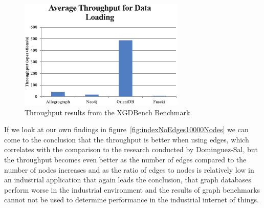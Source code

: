 \begin{figure}[!h]
  \centering
  \includegraphics[width=\textwidth]{images/benchmarks/XGDBenchResultsInsert}
  \caption{Throughput results from the XGDBench Benchmark\cite{Dayarathna2012}.}
  \label{fig:throughputXGDBench}
\end{figure}

If we look at our own findings in figure~\ref{fig:indexNoEdges10000Nodes} we can come to the conclusion that the throughput is better when using edges,
which correlates with the comparison to the research conducted by Dominguez-Sal,
but the throughput becomes even better as the number of edges compared to the number of nodes increases and as the ratio of edges to nodes is relatively low in an industrial application that again leads the conclusion,
that graph databases perform worse in the industrial environment and the results of graph benchmarks cannot not be used to determine performance in the industrial internet of things.
